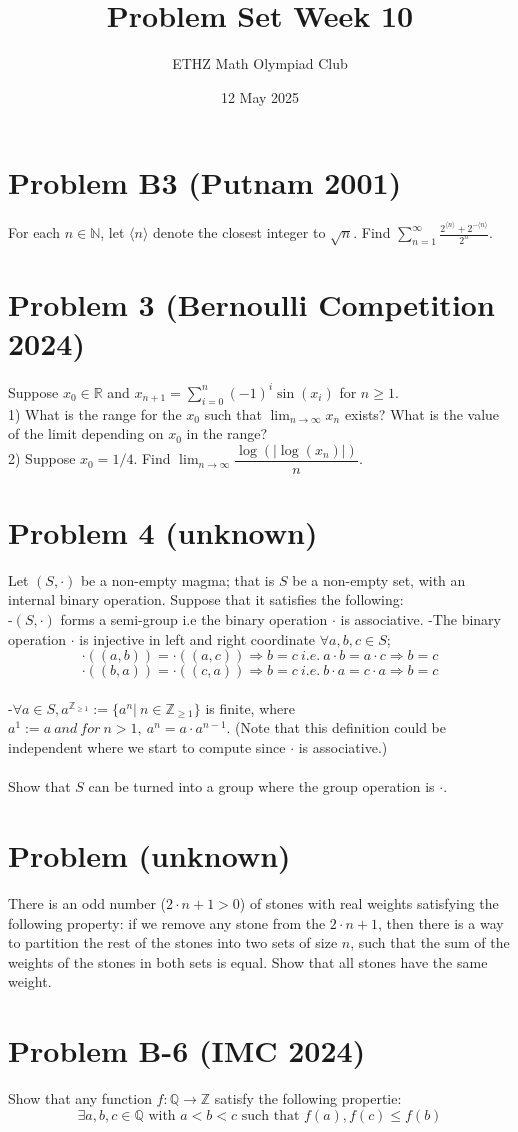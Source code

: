 \documentclass[11pt, a4paper, oneside]{article}
\title{Problem Set Week 10}
\author{ETHZ Math Olympiad Club}
\date{12 May 2025}
\newcommand{\problem}[1][]{\section{#1} \hfill \par}
\theoremstyle{remark}
\theoremstyle{lemma}
\begin{document}
\maketitle


\problem[Problem B3 (Putnam 2001)]
For each $n\in\mathbb{N}$, let \(\langle n \rangle\) denote the closest integer to $\sqrt{n}$. Find \(\sum_{n=1}^{\infty} \frac{2^{\langle n \rangle} + 2^{-\langle n \rangle}}{2^n}\).

\problem[Problem 3 (Bernoulli Competition 2024)]
Suppose \( x_0 \in \mathbb{R} \) and \( x_{n+1} = \sum_{i=0}^{n} (-1)^i \sin(x_i) \) for \( n \geq 1 \).\\
1) What is the range for the \( x_0 \) such that \( \lim_{n \to \infty} x_n \) exists? What is the value of the limit depending on \( x_0 \) in the range?\\
2) Suppose \( x_0 = 1/4 \). Find \( \lim_{n \to \infty} \dfrac{\log\left(\left| \log(x_n) \right|\right)}{n} \).

\problem[Problem 4 (unknown)]
Let $(S,\cdot)$ be a non-empty magma; that is $S$ be a non-empty set, with an internal binary operation. Suppose that it satisfies the following:\\
-$(S,\cdot)$ forms a semi-group i.e the binary operation $\cdot$ is associative.
-The binary operation $\cdot$ is injective in left and right coordinate $\forall a,b,c\in S$;\\ $$\cdot((a,b))=\cdot((a,c))\Rightarrow b=c\ i.e.\  a\cdot b=a\cdot c\Rightarrow b=c$$ $$\cdot((b,a))=\cdot((c,a))\Rightarrow b=c\ i.e.\ b\cdot a=c\cdot a\Rightarrow b=c$$\\
-$\forall a\in S, a^{\mathbb{Z}_{\geq 1}}:=\{a^n |\ n\in\mathbb{Z}_{\geq 1}\}$ is finite, where $a^1:=a\ and\ for\ n>1,\ a^n=a\cdot a^{n-1}$.
(Note that this definition could be independent where we start to compute since $\cdot$ is associative.)\\\\
Show that $S$ can be turned into a group where the group operation is $\cdot$.

\problem[Problem (unknown)]
There is an odd number ($2 \cdot n + 1 > 0$) of stones with real weights satisfying the following property: if we remove any stone from the $2 \cdot n + 1$, then there is a way to partition the rest of the stones into two sets of size $n$, such that the sum of the weights of the stones in both sets is equal. Show that all stones have the same weight.

\problem[Problem B-6 (IMC 2024)]

Show that any function $f:\mathbb{Q}\longrightarrow\mathbb{Z}$ satisfy the following propertie:
$$\exists a,b,c\in\mathbb{Q}\text{ with } a<b<c \text{ such that } f(a), f(c)\leq f(b)$$
\end{document}
